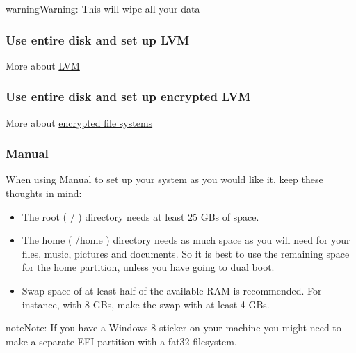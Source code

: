 \documentclass[letterpaper,10pt,english]{sphinxmanual}
\begin{document}
\begin{sphinxadmonition}{warning}{Warning:}
This will wipe all your data
\end{sphinxadmonition}


\subsubsection{Use entire disk and set up LVM}
\label{\detokenize{docs/installation:use-entire-disk-and-set-up-lvm}}
More about \href{https://wiki.ubuntu.com/Lvm}{LVM}


\subsubsection{Use entire disk and set up encrypted LVM}
\label{\detokenize{docs/installation:use-entire-disk-and-set-up-encrypted-lvm}}
More about \href{https://help.ubuntu.com/community/EncryptedFilesystems}{encrypted file systems}


\subsubsection{Manual}
\label{\detokenize{docs/installation:manual}}

When using Manual to set up your system as you would like it, keep these thoughts in mind:
\begin{itemize}
\item {} 
The root ( / ) directory needs at least 25 GBs of space.

\item {} 
The home ( /home ) directory needs as much space as you will need for your files, music, pictures and documents.
So it is best to use the remaining space for the home partition, unless you have going to dual boot.

\item {} 
Swap space of at least half of the available RAM is recommended. For instance, with 8 GBs, make the swap with at least 4 GBs.

\end{itemize}

\begin{sphinxadmonition}{note}{Note:}
If you have a Windows 8 sticker on your machine you might need to make a separate EFI partition with a fat32 filesystem.
\end{sphinxadmonition}
\end{document}
